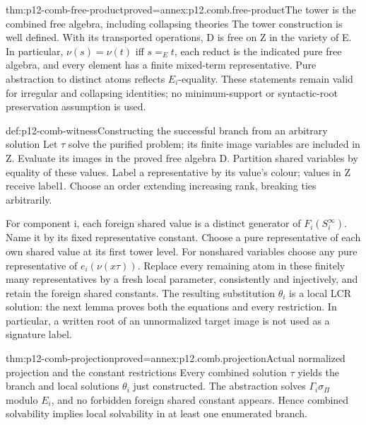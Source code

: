 \begin{hblemma}{thm:p12-comb-free-product}{proved=annex:p12.comb.free-product}{The tower is the combined free algebra, including collapsing theories}
The tower construction is well defined. With its transported operations,
D is free on Z in the variety of E. In particular,
\(\nu(s)=\nu(t)\) iff \(s=_Et\), each reduct is the indicated pure
free algebra, and every element has a finite mixed-term representative.
Pure abstraction to distinct atoms reflects \(E_i\)-equality. These
statements remain valid for irregular and collapsing identities; no
minimum-support or syntactic-root preservation assumption is used.
\end{hblemma}

\begin{hbmethod}{def:p12-comb-witness}{Constructing the successful branch from an arbitrary solution}
Let \(\tau\) solve the purified problem; its finite image variables
are included in Z. Evaluate its images in the proved free algebra D.
Partition shared variables by equality of these values. Label a
representative by its value's colour; values in Z receive label1.
Choose an order extending increasing rank, breaking ties arbitrarily.

For component i, each foreign shared value is a distinct generator
of \(F_i(S_i^\infty)\). Name it by its fixed representative constant.
Choose a pure representative of each own shared value at its first
tower level. For nonshared variables choose any pure representative
of \(e_i(\nu(x\tau))\). Replace every remaining atom in these finitely
many representatives by a fresh local parameter, consistently and
injectively, and retain the foreign shared constants. The resulting
substitution \(\theta_i\) is a local LCR solution: the next lemma proves
both the equations and every restriction. In particular, a written
root of an unnormalized target image is not used as a signature label.
\end{hbmethod}

\begin{hblemma}{thm:p12-comb-projection}{proved=annex:p12.comb.projection}{Actual normalized projection and the constant restrictions}
Every combined solution \(\tau\) yields the branch and local solutions
\(\theta_i\) just constructed. The abstraction solves
\(\Gamma_i\sigma_\Pi\) modulo \(E_i\), and no forbidden foreign shared
constant appears. Hence combined solvability implies local solvability
in at least one enumerated branch.
\end{hblemma}

